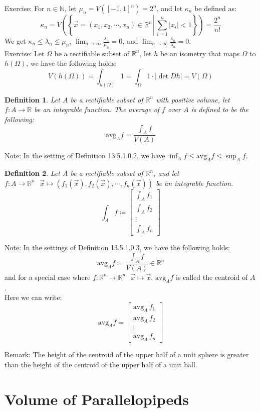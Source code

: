 \documentclass[15pt]{book}
\theoremstyle{break}
\theoremstyle{break}
\newtheorem{defn}{Definition}[corL]
\newcommand{\R}{\mathbb{R}}
\newcommand{\N}{\mathbb{N}}
\newcommand{\bmat}[1]{\begin{bmatrix} #1 \end{bmatrix}}
\newcommand{\note}{\color{red}Note: \color{black}}
\newcommand{\remark}{\color{blue}Remark: \color{black}}
\newcommand{\exercise}{\color{green}Exercise: \color{black}}
\begin{document}
\exercise
For $n \in \N$, let $\mu_n = V([-1,1]^n) = 2^n$, and let $\kappa_n$ be defined as:
$$\kappa_n = V\left(\left\{\vec{x}=(x_1,x_2,\cdots,x_n)\in \R^n \left|\  \sum_{i=1}^n|x_i| < 1 \right.\right\} \right)= \frac{2^n}{n!}$$
We get $\kappa_n \leq \lambda_n \leq \mu_n$, $\lim_{n\to \infty} \frac{\lambda_n}{\mu_n} = 0$, and $\lim_{n \to \infty} \frac{\kappa_n}{\lambda_n}= 0$. \\

\exercise Let $\Omega$ be a rectifiable subset of $\R^n$, let $h$ be an isometry that maps $\Omega$ to $h(\Omega)$, we have the following holds: $$V(h(\Omega)) = \int_{h(\Omega)} 1 = \int_{\Omega} 1\cdot |\det Dh| = V(\Omega)$$

\newpage
\begin{defn}
Let $A$ be a rectifiable subset of $\R^n$ with positive volume, let $f:A \to \R$ be an integrable function. The average of $f$ over $A$ is defined to be the following: $${\text{avg}}_A f = \frac{\int_A f}{V(A)}$$
\end{defn}
\note In the setting of Definition 13.5.1.0.2, we have $\inf_A f \leq {\text{avg}}_A f \leq \sup_A f$.\\

\begin{defn}
Let $A$ be a rectifiable subset of $\R^n$, and let $f:A\to \R^n \ \ \ \vec{x} \mapsto (f_1(\vec{x}),f_2(\vec{x}),\cdots, f_n(\vec{x}))$ be an integrable function. $$\int_A f \coloneqq \bmat{\int_A f_1 \\ \int_A f_2 \\ \vdots \\ \int_A f_n}$$
\end{defn}
\note In the settings of Definition 13.5.1.0.3, we have the following holds: 
$$\text{avg}_A f\coloneqq \frac{\int_A f}{V(A)}\in \R^n$$ 
and for a special case where $f:\R^n \to \R^n \ \ \ \vec{x}\mapsto \vec{x}$, $\text{avg}_A f$ is called the centroid of $A$. \\
Here we can write:
$$\text{avg}_A f = \bmat{\text{avg}_A \,f_1 \\ \text{avg}_A \, f_2 \\ \vdots \\ \text{avg}_A \, f_n}$$

\remark The height of the centroid of the upper half of a unit sphere is greater than the height of the centroid of the upper half of a unit ball.\\



\newpage
\section[Volume of Parallelopipeds]{\color{red} Volume of Parallelopipeds \color{black}}
\end{document}
